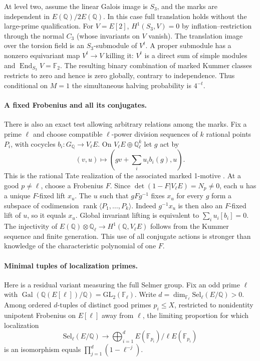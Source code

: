 \documentclass[11pt]{article}
\newcommand{\Q}{\mathbb Q}\newcommand{\Z}{\mathbb Z}\newcommand{\F}{\mathbb F}
\begin{document}
At level two, assume the linear Galois image is $S_3$, and the marks are independent in $E(\Q)/2E(\Q)$. In this case full translation holds without the large-prime qualification. For $V=E[2]$, $H^1(S_3,V)=0$ by inflation--restriction through the normal $C_3$ (whose invariants on $V$ vanish). The translation image over the torsion field is an $S_3$-submodule of $V^t$. A proper submodule has a nonzero equivariant map $V^t\to V$ killing it: $V^t$ is a direct sum of simple modules and $\operatorname{End}_{S_3}V=\F_2$. The resulting binary combination of marked Kummer classes restricts to zero and hence is zero globally, contrary to independence. Thus conditional on $M=1$ the simultaneous halving probability is $4^{-t}$.


\paragraph{A fixed Frobenius and all its conjugates.}
There is also an exact test allowing arbitrary relations among the marks. Fix a prime $\ell$ and choose compatible $\ell$-power division sequences of $k$ rational points $P_i$, with cocycles $b_i:G_\Q\to V_\ell E$. On $V_\ell E\oplus\Q_\ell^k$ let $g$ act by
\[
 (v,u)\longmapsto\left(gv+\sum_i u_i b_i(g),u\right).
\]
This is the rational Tate realization of the associated marked 1-motive \cite{Jossen}. At a good $p\ne\ell$, choose a Frobenius $F$. Since $\det(1-F|V_\ell E)=N_p\ne0$, each $u$ has a unique $F$-fixed lift $x_u$. The $u$ such that $g F g^{-1}$ fixes $x_u$ for every $g$ form a subspace of codimension $\operatorname{rank}\langle P_1,\ldots,P_k\rangle$. Indeed $g^{-1}x_u$ is then also an $F$-fixed lift of $u$, so it equals $x_u$. Global invariant lifting is equivalent to $\sum_i u_i[b_i]=0$. The injectivity of $E(\Q)\otimes\Q_\ell\to H^1(\Q,V_\ell E)$ follows from the Kummer sequence and finite generation. This use of all conjugate actions is stronger than knowledge of the characteristic polynomial of one $F$.

\paragraph{Minimal tuples of localization primes.}
Here is a residual variant measuring the full Selmer group. Fix an odd prime $\ell$ with $\operatorname{Gal}(\Q(E[\ell])/\Q)=\mathrm{GL}_2(\F_\ell)$. Write $d=\dim_{\F_\ell}\mathrm{Sel}_\ell(E/\Q)>0$. Among ordered $d$-tuples of distinct good primes $p_i\le X$, restricted to nonidentity unipotent Frobenius on $E[\ell]$ away from $\ell$, the limiting proportion for which localization
\[
 \mathrm{Sel}_\ell(E/\Q)\longrightarrow
 \bigoplus_{i=1}^d E(\F_{p_i})/\ell E(\F_{p_i})
\]
is an isomorphism equals $\prod_{j=1}^d(1-\ell^{-j})$.
\end{document}

